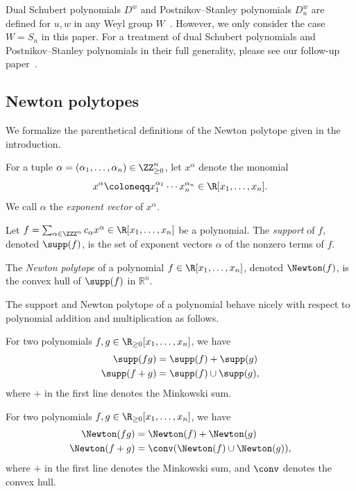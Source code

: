 \begin{rema}
    Dual Schubert polynomials $D^w$ and Postnikov--Stanley polynomials $D_u^w$ are defined for $u,w$ in any Weyl group $W$~\cite{PostnikovStanley}. However, we only consider the case $W = S_n$ in this paper. For a treatment of dual Schubert polynomials and Postnikov--Stanley polynomials in their full generality, please see our follow-up paper~\cite{PSLorentzian}.
\end{rema}

\subsection{Newton polytopes}
We formalize the parenthetical definitions of the Newton polytope given in the introduction. 

\begin{defi}\label{def:expvector}
    For a tuple $\alpha = (\alpha_1, \dots, \alpha_n)\in \ZZ_{\ge 0}^n$, let $x^\alpha$ denote the monomial 
    \[x^\alpha \coloneqq x_1^{\alpha_1}\cdots x_n^{\alpha_n}\in \R[x_1, \dots, x_n].\]
    We call $\alpha$ the \emph{exponent vector} of $x^{\alpha}$.
\end{defi}

\begin{defi}\label{def:supp}
Let $f = \sum_{\alpha \in \ZZZ^{n}} c_{\alpha} x^{\alpha} \in \R[x_{1}, \ldots, x_{n}]$ be a polynomial. 
    The \emph{support} of $f$, denoted $\supp(f)$, is the set of exponent vectors $\alpha$ of the nonzero terms of $f$.
\end{defi}
\begin{defi}\label{def:newton}
    The \emph{Newton polytope} of a polynomial $f\in \R[x_1, \dots, x_n]$, denoted $\Newton(f)$, is the convex hull of $\supp(f)$ in $\mathbb{R}^n$.
\end{defi}

The support and Newton polytope of a polynomial behave nicely with respect to polynomial addition and multiplication as follows. 
\begin{prop}\label{prop:suppsumprod}
    For two polynomials $f, g\in\R_{\ge 0}[x_1, \dots, x_n]$, we have 
    \begin{align*}
        \supp(fg) &=\supp(f)+\supp(g)\\
        \supp(f+g) &=\supp(f)\cup\supp(g),
    \end{align*}
     where $+$ in the first line denotes the Minkowski sum.
\end{prop}

\begin{prop}\label{prop:Newtonsumprod}
    For two polynomials $f, g\in\R_{\ge 0}[x_1, \dots, x_n]$, we have 
    \begin{align*}
        \Newton(fg) &=\Newton(f)+\Newton(g)\\
        \Newton(f+g) &=\conv(\Newton(f)\cup\Newton(g)),
    \end{align*}
     where $+$ in the first line denotes the Minkowski sum, and $\conv$ denotes the convex hull.
\end{prop}

